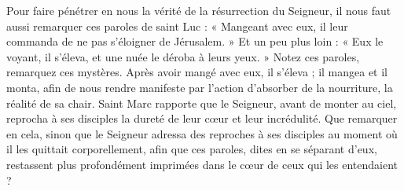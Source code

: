 Pour faire pénétrer en nous la vérité de la résurrection du Seigneur, il nous faut aussi remarquer ces paroles de saint Luc : « Mangeant avec eux, il leur commanda de ne pas s’éloigner de Jérusalem. » Et un peu plus loin : « Eux le voyant, il s’éleva, et une nuée le déroba à leurs yeux. » Notez ces paroles, remarquez ces mystères. Après avoir mangé avec eux, il s’éleva ; il mangea et il monta, afin de nous rendre manifeste par l’action d’absorber de la nourriture, la réalité de sa chair. Saint Marc rapporte que le Seigneur, avant de monter au ciel, reprocha à ses disciples la dureté de leur cœur et leur incrédulité. Que remarquer en cela, sinon que le Seigneur adressa des reproches à ses disciples au moment où il les quittait corporellement, afin que ces paroles, dites en se séparant d’eux, restassent plus profondément imprimées dans le cœur de ceux qui les entendaient ?